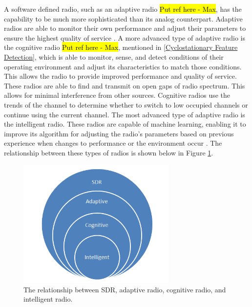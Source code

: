A software defined radio, such as an adaptive radio \hl{Put ref here - Max}, has the capability to be much more sophisticated than its analog counterpart. Adaptive radios are able to monitor their own performance and adjust their parameters to ensure the highest quality of service \cite{cog_radios}. A more advanced type of adaptive radio is the cognitive radio \hl{Put ref here - Max}, mentioned in \ref{Cyclostationary Feature Detection}, which is able to monitor, sense, and detect conditions of their operating environment and adjust its characteristics to match those conditions. This allows the radio to provide improved performance and quality of service. These radios are able to find and transmit on open gaps of radio spectrum. This allows for minimal interference from other sources. Cognitive radios use the trends of the channel to determine whether to switch to low occupied channels or continue using the current channel. The most advanced type of adaptive radio is the intelligent radio. These radios are capable of machine learning, enabling it to improve its algorithm for adjusting the radio's parameters based on previous experience when changes to performance or the environment occur \cite{int_radio}. The relationship between these types of radios is shown below in Figure \ref{fig:sdr_relationship_diagram}.\par
\begin{figure}[ht]
\centering
\includegraphics[width=0.70\textwidth]{img/sdr_diagram2.png}
\caption{The relationship between SDR, adaptive radio, cognitive radio, and intelligent radio.}
\label{fig:sdr_relationship_diagram}
\end{figure}\par
